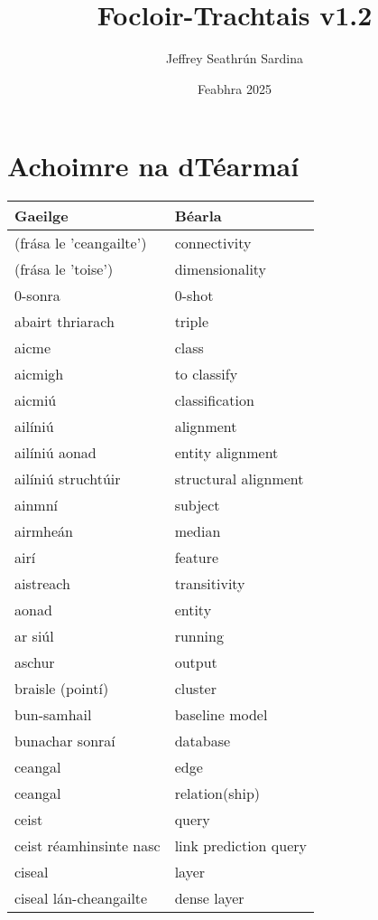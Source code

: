 \documentclass{article}
\title{Focloir-Trachtais v1.2}
\author{Jeffrey Seathrún Sardina}
\date{Feabhra 2025}
\begin{document}
            \maketitle

            \newpage
            \tableofcontents
        
\newpage \section{Achoimre na dTéarmaí}\begin{longtable}{|l|l|}
	\hline
		\textbf{Gaeilge} & \textbf{Béarla}\\ \hline 
		(frása le 'ceangailte')&connectivity\\ \hline 
		(frása le 'toise')&dimensionality\\ \hline 
		0-sonra&0-shot\\ \hline 
		abairt thriarach&triple\\ \hline 
		aicme&class\\ \hline 
		aicmigh&to classify\\ \hline 
		aicmiú&classification\\ \hline 
		ailíniú&alignment\\ \hline 
		ailíniú aonad&entity alignment\\ \hline 
		ailíniú struchtúir&structural alignment\\ \hline 
		ainmní&subject\\ \hline 
		airmheán&median\\ \hline 
		airí&feature\\ \hline 
		aistreach&transitivity\\ \hline 
		aonad&entity\\ \hline 
		ar siúl&running\\ \hline 
		aschur&output\\ \hline 
		braisle (pointí)&cluster\\ \hline 
		bun-samhail&baseline model\\ \hline 
		bunachar sonraí&database\\ \hline 
		ceangal&edge\\ \hline 
		ceangal&relation(ship)\\ \hline 
		ceist&query\\ \hline 
		ceist réamhinsinte nasc&link prediction query\\ \hline 
		ciseal&layer\\ \hline 
		ciseal lán-cheangailte&dense layer\\ \hline 

\end{longtable}
\end{document}
